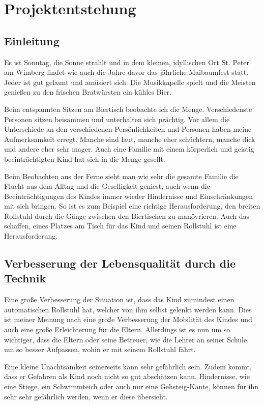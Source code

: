 \section{Projektentstehung}
\subsection{Einleitung}
Es ist Sonntag, die Sonne strahlt und in dem kleinen, idyllischen Ort St. Peter am Wimberg findet wie auch die Jahre davor das jährliche Maibaumfest statt.
Jeder ist gut gelaunt und amüsiert sich.
Die Musikkapelle spielt und die Meisten genießen zu den frischen Bratwürsten ein kühles Bier.

Beim entspannten Sitzen am Biertisch beobachte ich die Menge.
Verschiedenste Personen sitzen beisammen und unterhalten sich prächtig.
Vor allem die Unterschiede an den verschiedenen Persönlichkeiten und Personen haben meine Aufmerksamkeit erregt.
Manche sind laut, manche eher schüchtern, manche dick und andere eher sehr mager.
Auch eine Familie mit einem körperlich und geistig beeinträchtigten Kind hat sich in die Menge gesellt.

Beim Beobachten aus der Ferne sieht man wie sehr die gesamte Familie die Flucht aus dem Alltag und die Geselligkeit geniest, auch wenn die Beeinträchtigungen des Kindes immer wieder Hindernisse und Einschränkungen mit sich bringen.
So ist es zum Beispiel eine richtige Herausforderung, den breiten Rollstuhl durch die Gänge zwischen den Biertischen zu manövrieren. 
Auch das schaffen, eines Platzes am Tisch für das Kind und seinen Rollstuhl ist eine Herausforderung.


\subsection{Verbesserung der Lebensqualität durch die Technik}
Eine große Verbesserung der Situation ist, dass das Kind zumindest einen automatischen Rollstuhl hat, welcher von ihm selbst gelenkt werden kann.
Dies ist meiner Meinung nach eine große Verbesserung der Mobilität des Kindes und auch eine große Erleichterung für die Eltern.
Allerdings ist es nun um so wichtiger, dass die Eltern oder seine Betreuer, wie die Lehrer an seiner Schule, um so besser Aufpassen, wohin er mit seinem Rollstuhl fährt.

Eine kleine Unachtsamkeit seinerseits kann sehr gefährlich sein.
Zudem kommt, dass er Gefahren als Kind noch nicht so gut abschätzen kann.
Hindernisse, wie eine Stiege, ein Schwimmteich oder auch nur eine Gehsteig-Kante, können für ihn sehr sehr gefährlich werden, wenn er diese übersieht.



